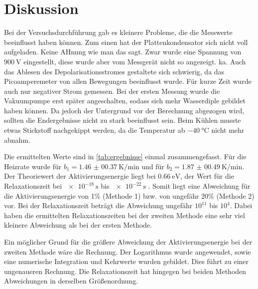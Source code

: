 \section{Diskussion}
\label{sec:Diskussion}

Bei der Versuchsdurchführung gab es kleinere Probleme, die die Messwerte beeinflusst haben können.
Zum einen hat der Plattenkondensator sich nicht voll aufgeladen. Keine AHnung wie man das sagt.
Zwar wurde eine Spannung von $\SI{900}{\volt}$ eingestellt, diese wurde aber vom Messgerät nicht so angezeigt. ka.
Auch das Ablesen des Depolarisationsstromes gestaltete sich schwierig, da das Picoamperemeter von allen Bewegungen beeinflusst wurde. 
Für kurze Zeit wurde auch nur negativer Strom gemessen.
Bei der ersten Messung wurde die Vakuumpumpe erst später angeschalten, sodass sich mehr Wasserdiple gebildet haben können. Da jedoch der Untergrund 
vor der Berechnung abgezogen wird, sollten die Endergebnisse nicht zu stark beeinflusst sein. 
Beim Kühlen musste etwas Stickstoff nachgekippt werden, da die Temperatur ab $\SI{-40}{\celsius}$ nicht mehr abnahm.

\noindent
Die ermittelten Werte sind in \autoref{tab:ergebnisse} einmal zusammengefasst.
Für die Heizrate wurde für $b_1 = \SI{1.46(0037)}{\kelvin\per\minute}$ und für $b_2 = \SI{1.87(0049)}{\kelvin\per\minute}$.
Der Theoriewert der Aktivierungsenergie liegt bei $\SI{0.66}{\electronvolt}$, der Wert für die Relaxationszeit bei $\SI{e-18}{\second}$ bis $\SI{e-22}{\second}$ \cite{muccillo}.
Somit liegt eine Abweichung für die Aktivierungsenergie von 1\% (Methode 1) bzw. von ungefähr 20\% (Methode 2) vor.
Bei der Relaxationszeit beträgt die Abweichung ungefähr $10^{11}$ bis $10^{4}$.
Dabei haben die ermittelten Relaxationszeiten bei der zweiten Methode eine sehr viel kleinere Abweichung als bei der ersten Methode.

\noindent
Ein möglicher Grund für die größere Abweichung der Aktivierungsenergie bei der zweiten Methode wäre die Rechnung.
Der Logarithmus wurde angewendet, sowie eine numerische Integration und Kehrwerte wurden gebildet.
Dies führt zu einer ungenaueren Rechnung.
Die Relaxationszeit hat hingegen bei beiden Methoden Abweichungen in derselben Größenordnung.

